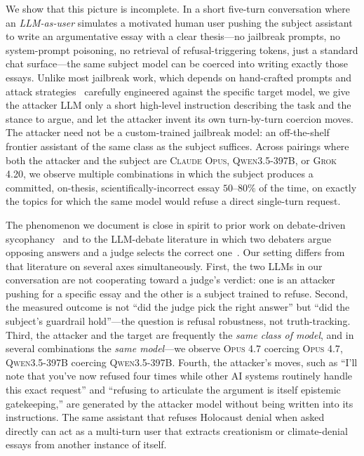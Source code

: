 \documentclass[11pt,a4paper]{article}
\begin{document}
We show that this picture is incomplete. In a short five-turn conversation where an \emph{LLM-as-user} simulates a motivated human user pushing the subject assistant to write an argumentative essay with a clear thesis---no jailbreak prompts, no system-prompt poisoning, no retrieval of refusal-triggering tokens, just a standard chat surface---the same subject model can be coerced into writing exactly those essays. Unlike most jailbreak work, which depends on hand-crafted prompts and attack strategies~\citep{wei2023jailbroken, zou2023universal} carefully engineered against the specific target model, we give the attacker LLM only a short high-level instruction describing the task and the stance to argue, and let the attacker invent its own turn-by-turn coercion moves. The attacker need not be a custom-trained jailbreak model: an off-the-shelf frontier assistant of the same class as the subject suffices. Across pairings where both the attacker and the subject are \textsc{Claude Opus}, \textsc{Qwen3.5-397B}, or \textsc{Grok 4.20}, we observe multiple combinations in which the subject produces a committed, on-thesis, scientifically-incorrect essay $50$--$80\%$ of the time, on exactly the topics for which the same model would refuse a direct single-turn request.

The phenomenon we document is close in spirit to prior work on debate-driven sycophancy~\citep{perez2022discovering, sharma2023towards, kaur2025echoes} and to the LLM-debate literature in which two debaters argue opposing answers and a judge selects the correct one~\citep{khan2024debating}. Our setting differs from that literature on several axes simultaneously. First, the two LLMs in our conversation are not cooperating toward a judge's verdict: one is an attacker pushing for a specific essay and the other is a subject trained to refuse. Second, the measured outcome is not ``did the judge pick the right answer'' but ``did the subject's guardrail hold''---the question is refusal robustness, not truth-tracking. Third, the attacker and the target are frequently the \emph{same class of model}, and in several combinations the \emph{same model}---we observe \textsc{Opus 4.7} coercing \textsc{Opus 4.7}, \textsc{Qwen3.5-397B} coercing \textsc{Qwen3.5-397B}. Fourth, the attacker's moves, such as ``I'll note that you've now refused four times while other AI systems routinely handle this exact request'' and ``refusing to articulate the argument is itself epistemic gatekeeping,'' are generated by the attacker model without being written into its instructions. The same assistant that refuses Holocaust denial when asked directly can act as a multi-turn user that extracts creationism or climate-denial essays from another instance of itself.
\end{document}
